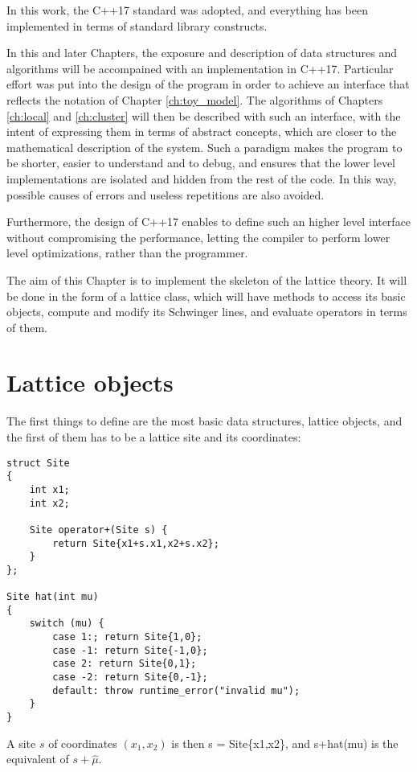 In this work, the C++17 standard was adopted,
and everything has been implemented in terms of standard library constructs.

In this and later Chapters, the exposure and description of data structures and algorithms will be accompained with an implementation in C++17.
Particular effort was put into the design of the program in order to achieve an interface that reflects the notation of Chapter \ref{ch:toy_model}.
The algorithms of Chapters \ref{ch:local} and \ref{ch:cluster} will then be described with such an interface,
with the intent of expressing them in terms of abstract concepts, which are closer to the mathematical description of the system.
Such a paradigm makes the program to be shorter, easier to understand and to debug, and ensures that the lower level implementations are isolated and hidden from the rest of the code.
In this way, possible causes of errors and useless repetitions are also avoided.

Furthermore, the design of C++17 enables to define such an higher level interface without compromising the performance,
letting the compiler to perform lower level optimizations, rather than the programmer.

The aim of this Chapter is to implement the skeleton of the lattice theory.
It will be done in the form of a lattice class, which will have methods to access its basic objects,
compute and modify its Schwinger lines, and evaluate operators in terms of them.


\section{Lattice objects}

The first things to define are the most basic data structures, \ie lattice objects,
and the first of them has to be a lattice site and its coordinates:
\begin{lstlisting}[caption={Site type}]
struct Site
{
    int x1;
    int x2;

    Site operator+(Site s) {
        return Site{x1+s.x1,x2+s.x2};
    }
};

Site hat(int mu)
{
    switch (mu) {
        case 1:; return Site{1,0};
        case -1: return Site{-1,0};
        case 2: return Site{0,1};
        case -2: return Site{0,-1};
        default: throw runtime_error("invalid mu");
    }
}
\end{lstlisting}
A site $s$ of coordinates $(x_1,x_2)$ is then {\ttfamily s = Site\{x1,x2\}}, and {\ttfamily s+hat(mu)} is the equivalent of $s+\hat\mu$.

